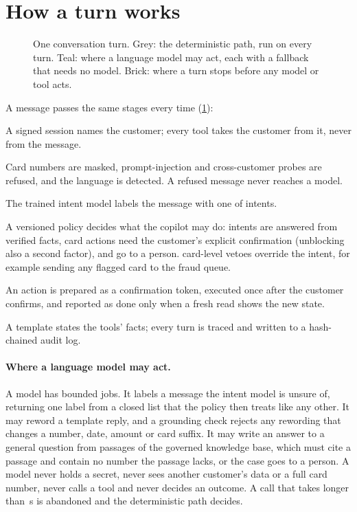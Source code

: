 \section{How a turn works}

\begin{figure}[htbp]
  \centering
  \resizebox{\linewidth}{!}{}
  \caption{One conversation turn. Grey: the deterministic path, run on every turn. Teal: where a language model may
  act, each with a fallback that needs no model. Brick: where a turn stops before any model or tool acts.}
  \label{fig:turn}
\end{figure}

A message passes the same stages every time (\cref{fig:turn}):
\begin{description}[style=nextline]
  \item[Identity] A signed session names the customer; every tool takes the customer from it, never from the message.
  \item[Gateway] Card numbers are masked, prompt-injection and cross-customer probes are refused, and the language
  is detected. A refused message never reaches a model.
  \item[Intent] The trained intent model labels the message with one of  intents.
  \item[Policy] A versioned policy decides what the copilot may do:  intents are
  answered from verified facts,  card actions need the customer's explicit confirmation
  (unblocking also a second factor), and  go to a person. 
  card-level vetoes override the intent, for example sending any flagged card to the fraud queue.
  \item[Tools] An action is prepared as a confirmation token, executed once after the customer confirms, and
  reported as done only when a fresh read shows the new state.
  \item[Reply] A template states the tools' facts; every turn is traced and written to a hash-chained audit log.
\end{description}

\paragraph{Where a language model may act.} A model has bounded jobs. It labels a message the intent model is
unsure of, returning one label from a closed list that the policy then treats like any other. It may reword a
template reply, and a grounding check rejects any rewording that changes a number, date, amount or card suffix. It
may write an answer to a general question from passages of the governed knowledge base, which must cite a passage
and contain no number the passage lacks, or the case goes to a person. A model never holds a secret, never sees
another customer's data or a full card number, never calls a tool and never decides an outcome. A call that takes
longer than \,s is abandoned and the deterministic path decides.
